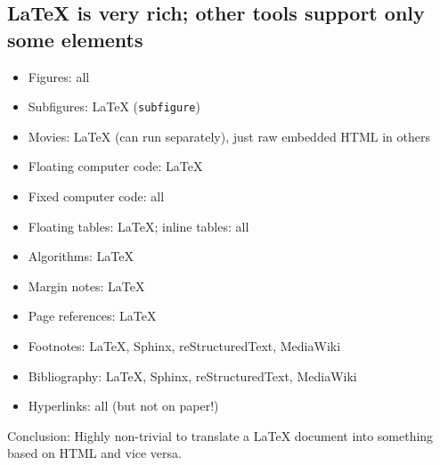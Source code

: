 \documentclass[%
oneside,                 %
final,                   %
10pt]{article}
\begin{document}
\subsection{{\LaTeX} is very rich; other tools support only some elements}
\begin{itemize}
 \item Figures: all
 \item Subfigures: {\LaTeX} (\texttt{subfigure})
 \item Movies: {\LaTeX} (can run separately), just raw embedded HTML in others
 \item Floating computer code: {\LaTeX}
 \item Fixed computer code: all
 \item Floating tables: {\LaTeX}; inline tables: all
 \item Algorithms: {\LaTeX}
 \item Margin notes: {\LaTeX}
 \item Page references: {\LaTeX}
 \item Footnotes: {\LaTeX}, Sphinx, reStructuredText, MediaWiki
 \item Bibliography: {\LaTeX}, Sphinx, reStructuredText, MediaWiki
 \item Hyperlinks: all (but not on paper!)
\end{itemize}
\noindent
Conclusion: Highly non-trivial to translate a {\LaTeX} document into something
based on HTML and vice versa.
\end{document}
